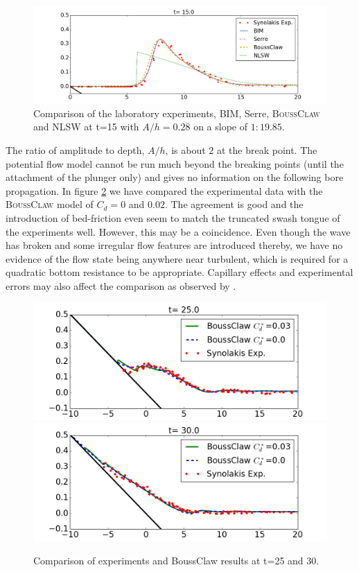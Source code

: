 \documentclass[review]{elsarticle}
\newcommand{\BoussClaw}{\textsc{BoussClaw} }
\begin{document}
\begin{figure}[!htb]
\centering
\includegraphics[width=\textwidth]{_fig/lab_bim_bouss_t15.png}
\caption{Comparison of the laboratory experiments, BIM, Serre, \BoussClaw and NLSW at t=15 with $A/h=0.28$ 
on a slope of $1:19.85$.}
\label{fig:lab_bim}
\end{figure}

The ratio of amplitude to depth, $A/h$, 
is about $2$ at the break point.
The potential flow model cannot be run much beyond the
breaking points (until the attachment of the plunger only) and 
gives no information on the following bore propagation.
In figure \ref{fig:BoussClaw_runup} we have compared
the experimental data with the \BoussClaw model 
of $C_d = 0$ and $0.02$. 
The agreement is good and the introduction of bed-friction 
even seem to match the truncated swash tongue of the experiments well. However, this may be a coincidence. 
Even though the  wave has broken and some irregular flow features are introduced thereby, we have no evidence of the flow state being
anywhere near turbulent, which is required for a quadratic bottom resistance to be appropriate. 
Capillary effects and 
experimental errors may also affect the comparison
as observed by \cite{Pedersen:2013}.

\begin{figure}[tbh!]
	\centering
	\includegraphics[width=.8\textwidth]{_fig/BoussClaw_lab_Cd_t25}\\
	\includegraphics[width=.8\textwidth]{_fig/BoussClaw_lab_Cd_t30}
	\caption{Comparison of experiments and BoussClaw results 
		at t=25 and 30.}
	\label{fig:BoussClaw_runup}
\end{figure}
\end{document}
